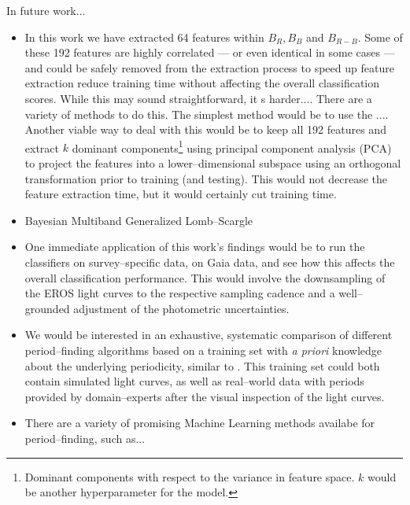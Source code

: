 
In future work...
\begin{itemize}
 
\item In this work we have extracted 64 features within $B_R, B_B$ and $B_{R-B}$. Some of these 192 features are highly correlated --- or even identical in some cases --- and could be safely removed from the extraction process to speed up feature extraction reduce training time without affecting the overall classification scores. While this may sound straightforward, it s harder.... There are a variety of methods to do this. The simplest method would be to use the .... Another viable way to deal with this would be to keep all 192 features and extract $k$ dominant components\footnote{Dominant components with respect to the variance in feature space. $k$ would be another hyperparameter for the model.} using principal component analysis (PCA) to project the features into a lower--dimensional subspace using an orthogonal transformation prior to training (and testing). This would not decrease the feature extraction time, but it would certainly cut training time.
 
\item Bayesian Multiband Generalized Lomb--Scargle

\item One immediate application of this work's findings would be to run the classifiers on survey--specific data, \eg on Gaia data, and see how this affects the overall classification performance. This would involve the downsampling of the EROS light curves to the respective sampling cadence and a well--grounded adjustment of the photometric uncertainties.

\item We would be interested in an exhaustive, systematic comparison of different period--finding algorithms based on a training set with \emph{a priori} knowledge about the underlying periodicity, similar to \citet{graham2013b}. This training set could both contain simulated light curves, as well as real--world data with periods provided by domain--experts after the visual inspection of the light curves.

\item There are a variety of promising Machine Learning methods availabe for period--finding, such as...

\end{itemize}